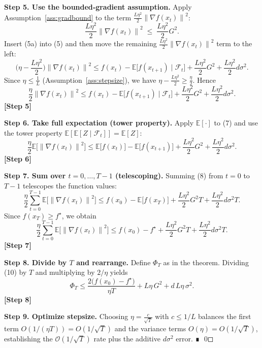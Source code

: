 \documentclass{article}
\newcommand{\E}{\mathbb{E}}
\newcommand{\norm}[1]{\left\|#1\right\|}
\begin{document}
\noindent\textbf{Step 5. Use the bounded‑gradient assumption.}  
Apply Assumption~\ref{ass:gradbound} to the term $\frac{L\eta^{2}}{2}\norm{\nabla f(x_{t})}^{2}$:
\[
\frac{L\eta^{2}}{2}\norm{\nabla f(x_{t})}^{2}
\;\le\;
\frac{L\eta^{2}}{2}G^{2}.
\tag{5a}
\]
Insert (5a) into (5) and then move the remaining $\frac{L\eta^{2}}{2}\norm{\nabla f(x_{t})}^{2}$ term to the left:
\[
\Big(\eta-\frac{L\eta^{2}}{2}\Big)\norm{\nabla f(x_{t})}^{2}
\le f(x_{t})-\E\!\big[f(x_{t+1})\mid\mathcal{F}_{t}\big]
   +\frac{L\eta^{2}}{2}G^{2}
   +\frac{L\eta^{2}}{2}d\sigma^{2}.
\tag{6}
\]
Since $\eta\le\frac{1}{L}$ (Assumption~\ref{ass:stepsize}), we have $\eta-\frac{L\eta^{2}}{2}\ge\frac{\eta}{2}$. Hence
\[
\frac{\eta}{2}\norm{\nabla f(x_{t})}^{2}
\le f(x_{t})-\E\!\big[f(x_{t+1})\mid\mathcal{F}_{t}\big]
   +\frac{L\eta^{2}}{2}G^{2}
   +\frac{L\eta^{2}}{2}d\sigma^{2}.
\tag{7}
\]
\textbf{[Step 5]}

\noindent\textbf{Step 6. Take full expectation (tower property).}  
Apply $\E[\cdot]$ to (7) and use the tower property $\E[\E[Z\mid\mathcal{F}_{t}]]= \E[Z]$:
\[
\frac{\eta}{2}\E\!\big[\norm{\nabla f(x_{t})}^{2}\big]
\le \E\!\big[f(x_{t})\big]-\E\!\big[f(x_{t+1})\big]
   +\frac{L\eta^{2}}{2}G^{2}
   +\frac{L\eta^{2}}{2}d\sigma^{2}.
\tag{8}
\]
\textbf{[Step 6]}

\noindent\textbf{Step 7. Sum over $t=0,\dots,T-1$ (telescoping).}  
Summing (8) from $t=0$ to $T-1$ telescopes the function values:
\[
\frac{\eta}{2}\sum_{t=0}^{T-1}\E\!\big[\norm{\nabla f(x_{t})}^{2}\big]
\le f(x_{0})-\E\!\big[f(x_{T})\big]
   +\frac{L\eta^{2}}{2}G^{2}T
   +\frac{L\eta^{2}}{2}d\sigma^{2}T.
\tag{9}
\]
Since $f(x_{T})\ge f^{\star}$, we obtain
\[
\frac{\eta}{2}\sum_{t=0}^{T-1}\E\!\big[\norm{\nabla f(x_{t})}^{2}\big]
\le f(x_{0})-f^{\star}
   +\frac{L\eta^{2}}{2}G^{2}T
   +\frac{L\eta^{2}}{2}d\sigma^{2}T.
\tag{10}
\]
\textbf{[Step 7]}

\noindent\textbf{Step 8. Divide by $T$ and rearrange.}  
Define $\Phi_{T}$ as in the theorem. Dividing (10) by $T$ and multiplying by $2/\eta$ yields
\[
\Phi_{T}
\le \frac{2\big(f(x_{0})-f^{\star}\big)}{\eta T}
   + L\eta\,G^{2}
   + d\,L\eta\,\sigma^{2}.
\tag{11}
\]
\textbf{[Step 8]}

\noindent\textbf{Step 9. Optimize stepsize.}  
Choosing $\eta = \frac{c}{\sqrt{T}}$ with $c\le 1/L$ balances the first term $O(1/(\eta T)) = O(1/\sqrt{T})$ and the variance terms $O(\eta)=O(1/\sqrt{T})$, establishing the $\mathcal{O}(1/\sqrt{T})$ rate plus the additive $d\sigma^{2}$ error. ∎
\qed
\end{document}
